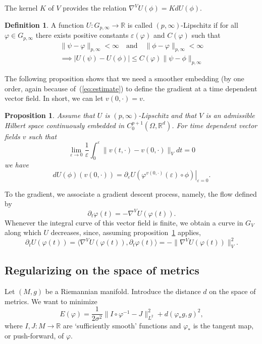 \documentclass[a5paper,11pt,twoside]{article}
\theoremstyle{plain}
\newtheorem{prop}[teo]{Proposition}
\newcommand{\R}{\ensuremath{\mathbb{R}}}
\theoremstyle{definition}
\newtheorem{defin}[teo]{Definition}
\begin{document}
The kernel $K$ of $V$ provides the relation $\nabla^VU(\phi)=KdU(\phi).$

\begin{defin}
A function $U:G_{p,\infty}\to \R$ is called $(p,\infty)$-Lipschitz if for all $\varphi\in G_{p,\infty}$ there exists positive constants $\varepsilon(\varphi)$ and $C(\varphi)$ such that
\begin{multline*}
\|\psi-\varphi\|_{p,\infty}<\infty\quad\mathrm{and}\quad \|\phi-\varphi\|_{p,\infty}<\infty\\
\implies |U(\psi)-U(\phi)|\leq C(\varphi)\|\psi-\phi\|_{p,\infty}
\end{multline*}
\end{defin}

The following proposition shows that we need a smoother embedding (by one order, again because of~(\ref{eq:estimate}) to define the gradient at a time dependent vector field. In short, we can let $v(0,\cdot)=v$.

\begin{prop}
\label{prop:gradient}
	Assume that $U$ is $(p,\infty)$-Lipschitz and that $V$ is an admissible Hilbert space continuously embedded in  $C_0^{p+1}(\Omega,\R^d)$. For time dependent vector fields $v$ such that
	\[
	\lim_{\varepsilon\to 0}\frac{1}{\varepsilon}\int_0^\varepsilon\|v(t,\cdot)-v(0,\cdot)\|_Vdt=0
	\]
	we have
	\[
	dU(\phi)(v(0,\cdot))=\left.\partial_\varepsilon U(\varphi^{v(0,\cdot)}(\varepsilon)\circ \phi)\right|_{\varepsilon=0}.
	\]
\end{prop}

To the gradient, we associate a gradient descent process, namely, the flow defined by
\[
\partial_t\varphi(t)=-\nabla^V U(\varphi(t)).
\]
Whenever the integral curve of this vector field is finite, we obtain a curve in $G_V$ along which $U$ decreases, since, assuming proposition~\ref{prop:gradient} applies,
\[
\partial_tU(\varphi(t))=\langle \nabla^VU(\varphi(t)),\partial_t\varphi(t)\rangle=-\|\nabla^VU(\varphi(t))\|^2_V.
\]


\subsection{Regularizing on the space of metrics}
Let $(M,g)$ be a Riemannian manifold. Introduce the distance $d$ on the space of metrics. We want to minimize
%
\begin{equation}
\label{mainfunctional}
E(\varphi)=\frac{1}{2\sigma^2}\|I\circ\varphi^{-1}-J\|_{L^2}^2+ d(\varphi_*g,g)^2,
\end{equation}
%
where $I,J:M\to\R$ are `sufficiently smooth' functions and $\varphi_*$ is the tangent map, or push-forward, of $\varphi$. 
\end{document}
